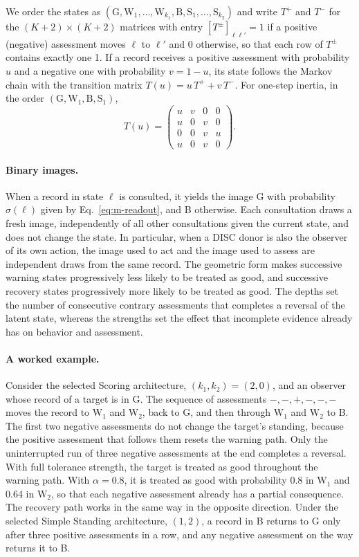 \documentclass[10pt]{wlscirep}
\newcommand{\st}[1]{\mathrm{#1}}           %
\theoremstyle{plain}
\theoremstyle{remark}
\begin{document}
We order the states as $(\st G,\st W_1,\ldots,\st W_{k_1},\st B,\st S_1,\ldots,\st S_{k_2})$ and write $T^+$ and $T^-$ for the $(K+2)\times(K+2)$ matrices with entry $[T^\pm]_{\ell\ell'}=1$ if a positive (negative) assessment moves $\ell$ to $\ell'$ and 0 otherwise, so that each row of $T^\pm$ contains exactly one 1. If a record receives a positive assessment with probability $u$ and a negative one with probability $v=1-u$, its state follows the Markov chain with the transition matrix $T(u)=u\,T^++v\,T^-$. For one-step inertia, in the order $(\st G,\st W_1,\st B,\st S_1)$,
\begin{equation}
T(u)=\begin{pmatrix}u&v&0&0\\u&0&v&0\\0&0&v&u\\u&0&v&0\end{pmatrix}.
\label{eq:s-transition}
\end{equation}

\paragraph{Binary images.} When a record in state $\ell$ is consulted, it yields the image G with probability $\sigma(\ell)$ given by Eq.~\eqref{eq:m-readout}, and B otherwise. Each consultation draws a fresh image, independently of all other consultations given the current state, and does not change the state. In particular, when a DISC donor is also the observer of its own action, the image used to act and the image used to assess are independent draws from the same record. The geometric form makes successive warning states progressively less likely to be treated as good, and successive recovery states progressively more likely to be treated as good. The depths set the number of consecutive contrary assessments that completes a reversal of the latent state, whereas the strengths set the effect that incomplete evidence already has on behavior and assessment.

\paragraph{A worked example.} Consider the selected Scoring architecture, $(k_1,k_2)=(2,0)$, and an observer whose record of a target is in G. The sequence of assessments $-,-,+,-,-,-$ moves the record to $\st W_1$ and $\st W_2$, back to G, and then through $\st W_1$ and $\st W_2$ to B. The first two negative assessments do not change the target's standing, because the positive assessment that follows them resets the warning path. Only the uninterrupted run of three negative assessments at the end completes a reversal. With full tolerance strength, the target is treated as good throughout the warning path. With $\alpha=0.8$, it is treated as good with probability 0.8 in $\st W_1$ and 0.64 in $\st W_2$, so that each negative assessment already has a partial consequence. The recovery path works in the same way in the opposite direction. Under the selected Simple Standing architecture, $(1,2)$, a record in B returns to G only after three positive assessments in a row, and any negative assessment on the way returns it to B.
\end{document}
